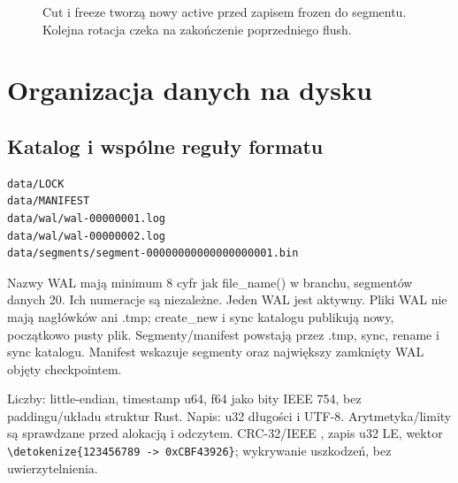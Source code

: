 \documentclass[11pt,a4paper]{article}
\newcommand{\code}[1]{\expandafter\nolinkurl\expandafter{\detokenize{#1}}}
\begin{document}
\begin{figure}[htbp]
\centering
{}
\caption{Cut i freeze tworzą nowy active przed zapisem frozen do segmentu.
Kolejna rotacja czeka na zakończenie poprzedniego flush.}
\end{figure}

\section{Organizacja danych na dysku}
\label{sec:storage}

\subsection{Katalog i wspólne reguły formatu}
\begin{lstlisting}
data/LOCK
data/MANIFEST
data/wal/wal-00000001.log
data/wal/wal-00000002.log
data/segments/segment-00000000000000000001.bin
\end{lstlisting}
Nazwy WAL mają minimum 8 cyfr jak file\_name() w branchu, segmentów
danych 20. Ich numeracje są niezależne. Jeden WAL jest aktywny.
Pliki WAL nie mają nagłówków ani .tmp; create\_new i sync katalogu
publikują nowy, początkowo pusty plik. Segmenty/manifest powstają przez
.tmp, sync, rename i sync katalogu. Manifest wskazuje segmenty oraz
największy zamknięty WAL objęty checkpointem.

Liczby: little-endian, timestamp u64, f64 jako bity IEEE 754,
bez paddingu/układu struktur Rust. Napis: u32 długości i UTF-8.
Arytmetyka/limity są sprawdzane przed alokacją i odczytem.
CRC-32/IEEE \cite{crc}, zapis u32 LE, wektor
\code{123456789 -> 0xCBF43926}; wykrywanie uszkodzeń, bez uwierzytelnienia.
\end{document}
